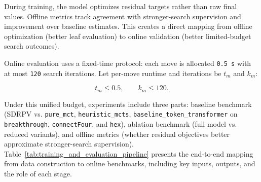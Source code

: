 During training, the model optimizes residual targets rather than raw final values. Offline metrics track agreement with stronger-search supervision and improvement over baseline estimates. This creates a direct mapping from offline optimization (better leaf evaluation) to online validation (better limited-budget search outcomes).


Online evaluation uses a fixed-time protocol: each move is allocated \texttt{0.5 s} with at most \texttt{120} search iterations. Let per-move runtime and iterations be $t_m$ and $k_m$:


\begin{equation}
t_m \le 0.5,\qquad k_m \le 120.
\end{equation}

Under this unified budget, experiments include three parts: baseline benchmark (SDRPV vs. \texttt{pure_mct}, \texttt{heuristic_mcts}, \texttt{baseline_token_transformer} on \texttt{breakthrough}, \texttt{connectFour}, and \texttt{hex}), ablation benchmark (full model vs. reduced variants), and offline metrics (whether residual objectives better approximate stronger-search supervision).
Table~\ref{tab:training_and_evaluation_pipeline} presents the end-to-end mapping from data construction to online benchmarks, including key inputs, outputs, and the role of each stage.


